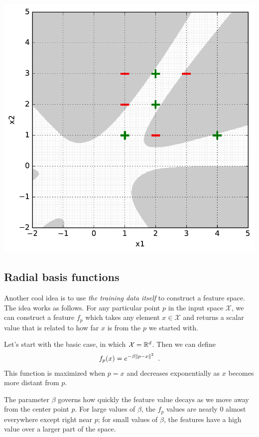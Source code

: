 \begin{examplebox}
\begin{center}
    \includegraphics[width=0.48\linewidth]{figures/feature_representation_hard_order5.pdf}
  \end{center}
\end{examplebox}




\subsection{Radial basis functions}
Another cool idea is to use {\em the training data itself} to
construct a feature space.  The idea works as follows.  For any
particular point $p$ in the input space $\mathcal{X}$, we can construct a feature
$f_p$ which takes any element $x \in \mathcal{X}$ and returns a
scalar value that is related to how far $x$ is from the $p$ we started
with.

Let's start with the basic case, in which $\mathcal{X} = \mathbb{R}^d$.  Then
we can define
\[f_p(x) = e^{-\beta\left\lVert p - x\right\rVert^2}\;\;.\]
This function is maximized when $p = x$ and decreases exponentially as
$x$ becomes more distant from $p$.

The parameter $\beta$ governs how
quickly the feature value decays as we move away from the center point
$p$.  For large values of $\beta$, the $f_p$ values are nearly 0
almost everywhere except right near $p$;  for small values of $\beta$,
the features have a high value over a larger part of the space.

